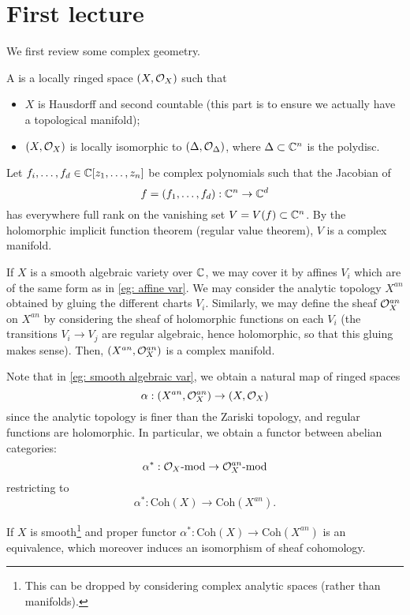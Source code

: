 \section{First lecture}
We first review some complex geometry.
\begin{definition}
	A  is a locally ringed space $(X,\mathcal{O}_X)$ such that
	\begin{itemize}
		\item $X$ is Hausdorff and second countable (this part is to ensure we actually have a topological manifold);
		\item $(X,\mathcal{O}_X)$ is locally isomorphic to $(\Delta,\mathcal{O}_\Delta)$, where $\Delta\subset \mathbb C^n$ is the polydisc.\qedbarhere 
	\end{itemize} 
\end{definition}
\begin{example}\label{eg: affine var}
	Let $f_i,\dots,f_d\in\mathbb C[z_1,\dots,z_n]$ be complex polynomials such that the Jacobian of
	\[f=(f_1,\dots,f_d):\mathbb C^n\to \mathbb C^d
	\]
	has everywhere full rank on the vanishing set $V=V(f)\subset \mathbb C^n$. By the holomorphic implicit function theorem (regular value theorem), $V$ is a complex manifold.
\end{example}
\begin{example}\label{eg: smooth algebraic var}
	If $X$ is a smooth algebraic variety over $\mathbb C$, we may cover it by affines $V_i$ which are of the same form as in \autoref{eg: affine var}. We may consider the analytic topology $X^{an}$ obtained by gluing the different charts $V_i$. Similarly, we may define the sheaf $\mathcal{O}_X^{an}$ on $X^{an}$ by considering the sheaf of holomorphic functions on each $V_i$ (the transitions $V_i\to V_j$ are regular algebraic, hence holomorphic, so that this gluing makes sense). Then, $(X^{an},\mathcal{O}_X^{an})$ is a complex manifold.
\end{example}

Note that in \autoref{eg: smooth algebraic var}, we obtain a natural map of ringed spaces
%
\[
\alpha:(X^{an},\mathcal{O}_X^{an})\to (X,\mathcal{O}_X)
\]
since the analytic topology is finer than the Zariski topology, and regular functions are holomorphic. In particular, we obtain a functor between abelian categories:
\[
\alpha^*:\mathcal{O}_X\text{-mod}\to \mathcal{O}_X^{an}\text{-mod}
\]
restricting to
\[
\alpha^*:\text{Coh}(X)\to \text{Coh}(X^{an}).
\]
\begin{theorem}
	If $X$ is smooth\footnote{This can be dropped by considering complex analytic spaces (rather than manifolds).} and proper functor $\alpha^*:\text{Coh}(X)\to\text{Coh}(X^{an})$ is an equivalence, which moreover induces an isomorphism of sheaf cohomology.
\end{theorem}
